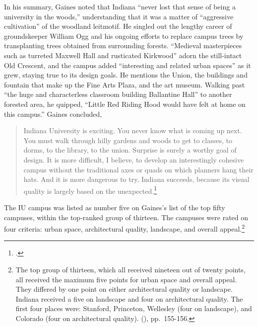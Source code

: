\documentclass[
  american,
  letterpaper,
]{scrreprt}
\begin{document}
In his summary, Gaines noted that Indiana ``never lost that sense of
being a university in the woods,'' understanding that it was a matter of
``aggressive cultivation'' of the woodland leitmotif. He singled out the
lengthy career of groundskeeper William Ogg and his ongoing efforts to
replace campus trees by transplanting trees obtained from surrounding
forests. ``Medieval masterpieces such as turreted Maxwell Hall and
rusticated Kirkwood'' adorn the still-intact Old Crescent, and the
campus added ``interesting and related urban spaces'' as it grew,
staying true to its design goals. He mentions the Union, the buildings
and fountain that make up the Fine Arts Plaza, and the art museum.
Walking past ``the huge and characterless classroom building Ballantine
Hall'' to another forested area, he quipped, ``Little Red Riding Hood
would have felt at home on this campus.'' Gaines concluded,

\begin{quote}
Indiana University is exciting. You never know what is coming up next.
You must walk through hilly gardens and woods to get to classes, to
dorms, to the library, to the union. Surprise is surely a worthy goal of
design. It is more difficult, I believe, to develop an interestingly
cohesive campus without the traditional axes or quads on which planners
hang their hats. And it is more dangerous to try. Indiana succeeds,
because its visual quality is largely based on the
unexpected.\footnote{.}
\end{quote}

The IU campus was listed as number five on Gaines's list of the top
fifty campuses, within the top-ranked group of thirteen. The campuses
were rated on four criteria: urban space, architectural quality,
landscape, and overall appeal.\footnote{The top group of thirteen, which
  all received nineteen out of twenty points, all received the maximum
  five points for urban space and overall appeal. They differed by one
  point on either architectural quality or landscape. Indiana received a
  five on landscape and four on architectural quality. The first four
  places were: Stanford, Princeton, Wellesley (four on landscape), and
  Colorado (four on architectural quality).
  (),
  pp.~155-156.}
\end{document}
